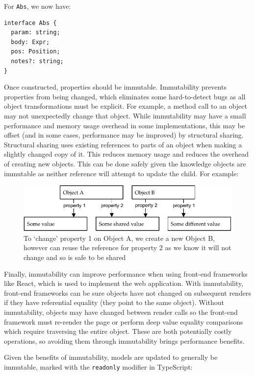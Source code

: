 \documentclass[a4paper,fleqn,oneside,12pt]{report}
\begin{document}
For \texttt{Abs}, we now have:

\begin{verbatim}
interface Abs {
  param: string;
  body: Expr;
  pos: Position;
  notes?: string;
}
\end{verbatim}
Once constructed, properties should be immutable. Immutability prevents properties from being changed, which eliminates some hard-to-detect bugs as all object transformations must be explicit. For example, a method call to an object may not unexpectedly change that object. While immutability may have a small performance and memory usage overhead in some implementations, this may be offset (and in some cases, performance may be improved) by structural sharing. Structural sharing uses existing references to parts of an object when making a slightly changed copy of it. This reduces memory usage and reduces the overhead of creating new objects. This can be done safely given the knowledge objects are immutable as neither reference will attempt to update the child. For example:

{\centering \begin{figure}[h!]
  \centering
  \includegraphics[width=\linewidth]{images/immutability.pdf}
  \caption{To `change' property 1 on Object A, we create a new Object B, however can reuse the reference for property 2 as we know it will not change and so is safe to be shared}
\end{figure} \par}

Finally, immutability can improve performance when using front-end frameworks like React, which is used to implement the web application. With immutability, front-end frameworks can be sure objects have not changed on subsequent renders if they have referential equality (they point to the same object). Without immutability, objects may have changed between render calls so the front-end framework must re-render the page or perform deep value equality comparisons which require traversing the entire object. These are both potentially costly operations, so avoiding them through immutability brings performance benefits.

Given the benefits of immutability, models are updated to generally be immutable, marked with the \texttt{readonly} modifier in TypeScript:
\end{document}
